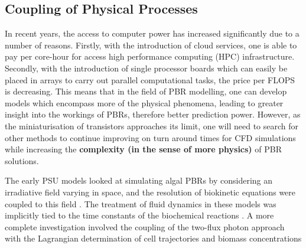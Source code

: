 
\subsection{Coupling of Physical Processes}
\label{S:2.6}
In recent years, the access to computer power has increased significantly due to a number of reasons. Firstly, with the introduction of cloud services, one is able to pay per core-hour for access high performance computing (HPC) infrastructure. Secondly, with the introduction of single processor boards which can easily be placed in arrays to carry out parallel computational tasks, the price per FLOPS is decreasing. This means that in the field of PBR modelling, one can develop models which encompass more of the physical phenomena, leading to greater insight into the workings of PBRs, therefore better prediction power. However, as the miniaturisation of transistors approaches its limit, one will need to search for other methods to continue improving on turn around times for CFD simulations while increasing the \textbf{complexity (in the sense of more physics)} of PBR solutions. 

\skippingparagraph
The early PSU models looked at simulating algal PBRs by considering an irradiative field varying in space, and the resolution of biokinetic equations were coupled to this field \cite{Wu2001,Wu2002,Merchuk2003a,Merchuk2007}. The treatment of fluid dynamics in these models was implicitly tied to the time constants of the biochemical reactions \cite{Merchuk2007}. A more complete investigation involved the coupling of the two-flux photon approach with the Lagrangian determination of cell trajectories and biomass concentrations \cite{Pruvost2008}



